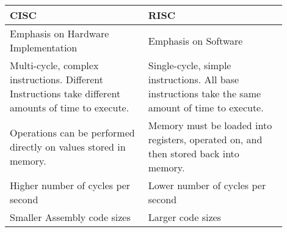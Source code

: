 \begin{table}[H]
\begin{centering}
\begin{tabular}{|m{0.45\linewidth}|m{0.45\linewidth}|}
\hline
\textbf{CISC} & \textbf{RISC} \\
\hline
Emphasis on Hardware Implementation 
    & Emphasis on Software \\
\hline
Multi-cycle, complex instructions. Different Instructions take different amounts of time to execute.
    & Single-cycle, simple instructions. All base instructions take the same amount of time to execute. \\
\hline
Operations can be performed directly on values stored in memory. 
    & Memory must be loaded into registers, operated on, and then stored back into memory. \\
\hline
Higher number of cycles per second 
    & Lower number of cycles per second \\
\hline
Smaller Assembly code sizes
    & Larger code sizes \\
\hline
\end{tabular}
\label{table:CISCvRISC}
\end{centering}
\end{table}